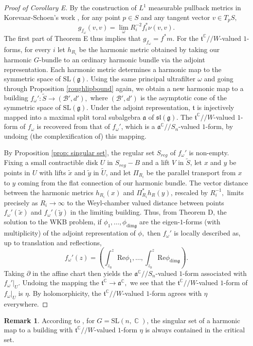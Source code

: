 \documentclass[10pt]{amsart}
\newcommand{\g}{\mathfrak{g}}
\newcommand{\ft}{\mathfrak{t}}
\theoremstyle{definition}
\newtheorem{remark}[thm]{Remark}
\DeclareMathOperator{\C}{\mathbb{C}}
\begin{document}
\begin{proof}[Proof of Corollary E]
By the construction of $L^1$ measurable pullback metrics in Korevaar-Schoen's work \cite{KS}, for any point $p\in S$ and any tangent vector $v\in T_pS,$ $$g_{f_\omega}(v,v)=\lim_{\omega}R_i^{-2} f_i^*\nu(v,v).$$
    The first part of Theorem E thus implies that $g_{f_{\omega}}=f^*m$. For the $\ft^{\C}//W$-valued $1$-forms, for every $i$ let $h_{R_i}$ be the harmonic metric obtained by taking our harmonic $G$-bundle to an ordinary harmonic bundle via the adjoint representation. Each harmonic metric determines a harmonic map to the symmetric space of $\textrm{SL}(\g).$ Using the same principal ultrafilter $\omega$ and going through Proposition \ref{roughlipbound} again, we obtain a new harmonic map to a building $f_\omega':\tilde{S}\to (\mathcal{B}',d'),$ where $(\mathcal{B}',d')$ is the asymptotic cone of the symmetric space of $\textrm{SL}(\g)$. 
    Under the adjoint representation, $\ft$ is injectively mapped into a maximal split toral subalgebra $\mathfrak{a}$ of $\mathfrak{sl}(\g)$. The $\ft^{\C}//W$-valued $1$-form of $f_\omega$ is recovered from that of $f_\omega'$, which is a $\mathfrak{a}^{\C}//S_n$-valued $1$-form, by undoing (the complexification of) this mapping.
    
    By Proposition \ref{prop: singular set}, the regular set $S_{reg}$ of $f_\omega'$ is non-empty. Fixing a small contractible disk $U$ in $S_{reg}-B$ and a lift $V$ in $\tilde{S}$, let $x$ and $y$ be points in $U$ with lifts $\tilde{x}$ and $\tilde{y}$ in $\tilde{U}$, and let $\Pi_{R_i}$ be the parallel transport from $x$ to $y$ coming from the flat connection of our harmonic bundle. The vector distance between the harmonic metrics $h_{R_i}(x)$ and $\Pi_{R_i}^*h_R(y)$, rescaled by $R_i^{-1},$ limits precisely as $R_i\to \infty$ to the Weyl-chamber valued distance between points $f_\omega'(\tilde{x})$ and $f_\omega'(\tilde{y})$ in the limiting building.
 Thus, from Theorem D, the solution to the WKB problem, if $\phi_1,\dots, \phi_{\textrm{dim}\g}$ are the eigen-$1$-forms (with multiplicity) of the adjoint representation of $\phi,$ then $f_\omega'$ is locally described as, up to translation and reflections, $$f_\omega'(z) = (\int_{z_0}^z\textrm{Re}\phi_1,\dots, \int_{z_0}^z \textrm{Re}\phi_{\textrm{dim}\g} ).$$  Taking $\partial$ in the affine chart then yields the $\mathfrak{a}^{\C}//S_n$-valued $1$-form associated with $f_\omega'|_U.$ Undoing the mapping the $\ft^{\C}\to \mathfrak{a}^{\C},$ we see that the $\ft^{\C}//W$-valued $1$-form of $f_\omega|_U$ is $\eta$. By holomorphicity, the $\ft^{\C}//W$-valued $1$-form agrees with $\eta$ everywhere.
\end{proof}
\begin{remark}
 According to \cite[Proposition 3.23]{KNPS}, for $G=\textrm{SL}(n,\C)$, the singular set of a harmonic map to a building with $\ft^{\C}//W$-valued $1$-form $\eta$ is always contained in the critical set.
\end{remark}
\end{document}
